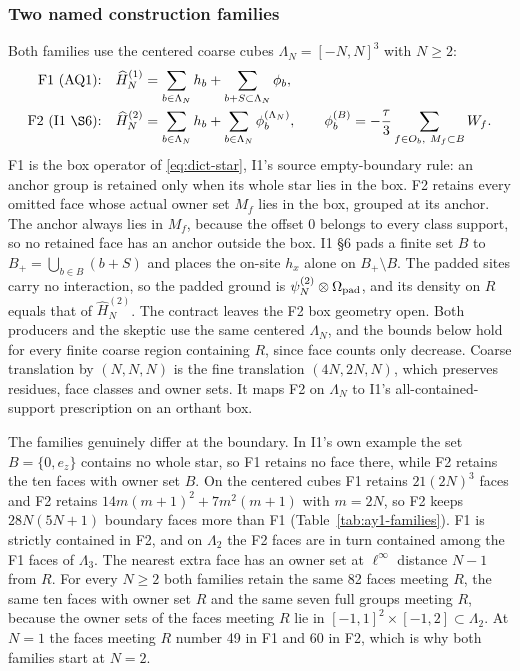 \subsubsection{Two named construction families}
\label{sec:ay1-families}
Both families use the centered coarse cubes $\Lambda_N=[-N,N]^3$ with
$N\ge2$:
\begin{equation}
 \begin{aligned}
 \text{F1 (AQ1):}\quad&\widehat H^{(1)}_N=\sum_{b\in\Lambda_N}h_b
 +\sum_{b+S\subset\Lambda_N}\phi_b,\\
 \text{F2 (I1 \S6):}\quad&\widehat H^{(2)}_N=\sum_{b\in\Lambda_N}h_b
 +\sum_{b\in\Lambda_N}\phi^{(\Lambda_N)}_b,\qquad
 \phi^{(B)}_b=-\frac\tau3\sum_{f\in O_b,\ M_f\subset B}W_f .
 \end{aligned}
 \label{eq:ay1-families}
\end{equation}
F1 is the box operator of \eqref{eq:dict-star}, I1's source empty-boundary
rule: an anchor group is retained only when its whole star lies in the box.
F2 retains every omitted face whose actual owner set $M_f$ lies in the box,
grouped at its anchor. The anchor always lies in $M_f$, because the offset $0$
belongs to every class support, so no retained face has an anchor outside the
box. I1 \S6 pads a finite set $B$ to $B_+=\bigcup_{b\in B}(b+S)$ and places
the on-site $h_x$ alone on $B_+\setminus B$. The padded sites carry no
interaction, so the padded ground is $\psi^{(2)}_N\otimes\Omega_{\rm pad}$,
and its density on $R$ equals that of $\widehat H^{(2)}_N$. The contract
leaves the F2 box geometry open. Both producers and the skeptic use the same
centered $\Lambda_N$, and the bounds below hold for every finite coarse region
containing $R$, since face counts only decrease. Coarse translation by
$(N,N,N)$ is the fine translation $(4N,2N,N)$, which preserves residues, face
classes and owner sets. It maps F2 on $\Lambda_N$ to I1's
all-contained-support prescription on an orthant box.

The families genuinely differ at the boundary. In I1's own example the set
$B=\{0,e_z\}$ contains no whole star, so F1 retains no face there, while F2
retains the ten faces with owner set $B$. On the centered cubes F1 retains
$21(2N)^3$ faces and F2 retains $14m(m+1)^2+7m^2(m+1)$ with $m=2N$, so F2
keeps $28N(5N+1)$ boundary faces more than F1
(Table~\ref{tab:ay1-families}). F1 is strictly contained in F2, and on
$\Lambda_2$ the F2 faces are in turn contained among the F1 faces of
$\Lambda_3$. The nearest extra face has an owner set at $\ell^\infty$ distance
$N-1$ from $R$. For every $N\ge2$ both families retain the same 82 faces
meeting $R$, the same ten faces with owner set $R$ and the same seven full
groups meeting $R$, because the owner sets of the faces meeting $R$ lie in
$[-1,1]^2\times[-1,2]\subset\Lambda_2$. At $N=1$ the faces meeting $R$ number
49 in F1 and 60 in F2, which is why both families start at $N=2$.

